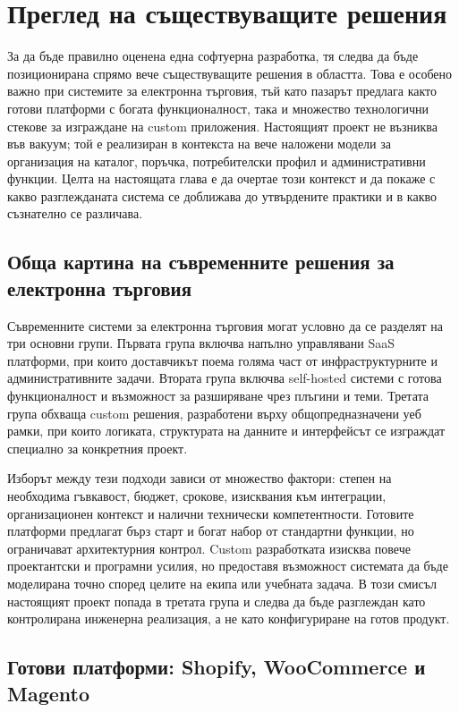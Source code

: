 \section{Преглед на съществуващите решения}

За да бъде правилно оценена една софтуерна разработка, тя следва да бъде позиционирана спрямо вече съществуващите решения в областта. Това е особено важно при системите за електронна търговия, тъй като пазарът предлага както готови платформи с богата функционалност, така и множество технологични стекове за изграждане на custom приложения. Настоящият проект не възниква във вакуум; той е реализиран в контекста на вече наложени модели за организация на каталог, поръчка, потребителски профил и административни функции. Целта на настоящата глава е да очертае този контекст и да покаже с какво разглежданата система се доближава до утвърдените практики и в какво съзнателно се различава.

\subsection{Обща картина на съвременните решения за електронна търговия}

Съвременните системи за електронна търговия могат условно да се разделят на три основни групи. Първата група включва напълно управлявани SaaS платформи, при които доставчикът поема голяма част от инфраструктурните и административните задачи. Втората група включва self-hosted системи с готова функционалност и възможност за разширяване чрез плъгини и теми. Третата група обхваща custom решения, разработени върху общопредназначени уеб рамки, при които логиката, структурата на данните и интерфейсът се изграждат специално за конкретния проект.

Изборът между тези подходи зависи от множество фактори: степен на необходима гъвкавост, бюджет, срокове, изисквания към интеграции, организационен контекст и налични технически компетентности. Готовите платформи предлагат бърз старт и богат набор от стандартни функции, но ограничават архитектурния контрол. Custom разработката изисква повече проектантски и програмни усилия, но предоставя възможност системата да бъде моделирана точно според целите на екипа или учебната задача. В този смисъл настоящият проект попада в третата група и следва да бъде разглеждан като контролирана инженерна реализация, а не като конфигуриране на готов продукт.

\subsection{Готови платформи: Shopify, WooCommerce и Magento}

